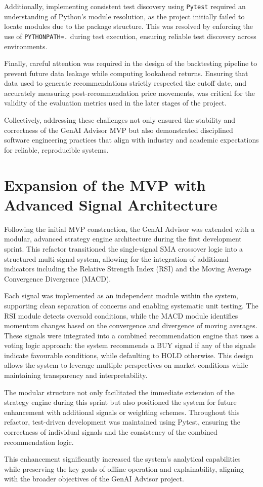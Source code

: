 Additionally, implementing consistent test discovery using \texttt{Pytest} required an understanding of Python's module resolution, as the project initially failed to locate modules due to the package structure. This was resolved by enforcing the use of \texttt{PYTHONPATH=.} during test execution, ensuring reliable test discovery across environments.

Finally, careful attention was required in the design of the backtesting pipeline to prevent future data leakage while computing lookahead returns. Ensuring that data used to generate recommendations strictly respected the cutoff date, and accurately measuring post-recommendation price movements, was critical for the validity of the evaluation metrics used in the later stages of the project.

Collectively, addressing these challenges not only ensured the stability and correctness of the GenAI Advisor MVP but also demonstrated disciplined software engineering practices that align with industry and academic expectations for reliable, reproducible systems.

\section{Expansion of the MVP with Advanced Signal Architecture}

Following the initial MVP construction, the GenAI Advisor was extended with a modular, advanced strategy engine architecture during the first development sprint. This refactor transitioned the single-signal SMA crossover logic into a structured multi-signal system, allowing for the integration of additional indicators including the Relative Strength Index (RSI) and the Moving Average Convergence Divergence (MACD).

Each signal was implemented as an independent module within the system, supporting clean separation of concerns and enabling systematic unit testing. The RSI module detects oversold conditions, while the MACD module identifies momentum changes based on the convergence and divergence of moving averages. These signals were integrated into a combined recommendation engine that uses a voting logic approach: the system recommends a BUY signal if any of the signals indicate favourable conditions, while defaulting to HOLD otherwise. This design allows the system to leverage multiple perspectives on market conditions while maintaining transparency and interpretability.

The modular structure not only facilitated the immediate extension of the strategy engine during this sprint but also positioned the system for future enhancement with additional signals or weighting schemes. Throughout this refactor, test-driven development was maintained using Pytest, ensuring the correctness of individual signals and the consistency of the combined recommendation logic.

This enhancement significantly increased the system's analytical capabilities while preserving the key goals of offline operation and explainability, aligning with the broader objectives of the GenAI Advisor project.
